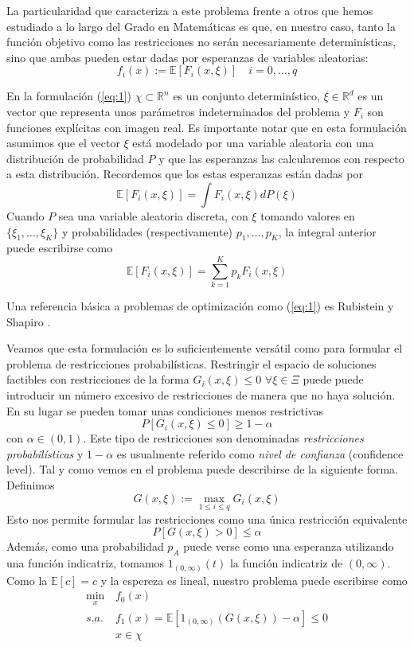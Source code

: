 \documentclass[twoside,a4paper,openright,12pt]{book}
\newcommand{\R}{\mathbb{R}}
\newcommand{\E}{\mathbb{E}}
\begin{document}
La particularidad que caracteriza a este problema frente a otros que hemos estudiado a lo largo del Grado en Matemáticas es que, en nuestro caso, tanto la función objetivo como las restricciones no serán necesariamente determinísticas, sino que ambas pueden estar dadas por esperanzas de variables aleatorias:
$$ 
f_i(x):=\E[F_i(x,\xi)] \quad i=0,\dotsc,q
$$

En la formulación (\ref{eq:1}) $\chi\subset \R^n$ es un conjunto determinístico, $\xi\in\R^d$ es un vector que representa unos parámetros indeterminados del problema y $F_i$ son funciones explícitas con imagen real. Es importante notar que en esta formulación asumimos que el vector $\xi$ está modelado por una variable aleatoria con una distribución de probabilidad $P$ y que las esperanzas las calcularemos con respecto a esta distribución. Recordemos que los estas esperanzas están dadas por
$$
\E[F_i(x,\xi)]=\int F_i(x,\xi)dP(\xi)
$$
Cuando $P$ sea una variable aleatoria discreta, con $\xi$ tomando valores en $\{\xi_1,\dotsc,\xi_K\}$ y probabilidades (respectivamente) $p_1,\dotsc,p_K$, la integral anterior puede escribirse como
$$
\E[F_i(x,\xi)] = \sum_{k=1}^K p_k F_i(x,\xi)
$$

Una referencia básica a problemas de optimización como (\ref{eq:1}) es Rubistein y Shapiro \cite{shapiro}. 

Veamos que esta formulación es lo suficientemente versátil como para formular el problema de restricciones probabilísticas. Restringir el espacio de soluciones factibles con restricciones de la forma $G_i(x,\xi)\leq 0$ $\forall \xi\in\Xi$ puede puede introducir un número excesivo de restricciones de manera que no haya solución. En su lugar se pueden tomar unas condiciones menos restrictivas
$$
P[G_i(x,\xi)\leq 0]\geq 1-\alpha
$$
con $\alpha\in (0,1)$. Este tipo de restricciones son denominadas \textit{restricciones probabilísticas} y $1-\alpha$ es usualmente referido como \textit{nivel de confianza} (confidence level). Tal y como vemos en \cite{chance} el problema puede describirse de la siguiente forma. Definimos $$G(x,\xi):=\max_{1\leq i\leq q}G_i(x,\xi)$$
Esto nos permite formular las restricciones como una única restricción equivalente
$$
P[G(x,\xi)> 0]\leq \alpha
$$
Además, como una probabilidad $p_A$ puede verse como una esperanza utilizando una función indicatriz, tomamos $1_{(0,\infty)}(t)$ la función indicatriz de $(0,\infty)$. Como la $\E[c]=c$ y la espereza es lineal, nuestro problema puede escribirse como
\begin{align*}
\min_{x} &f_0(x)\\
s.a.\;  & f_1(x)= \E[1_{(0,\infty)}(G(x,\xi))-\alpha]\leq 0 \tag{2} \label{eq:2}\\
&x\in\chi
\end{align*}
\end{document}
